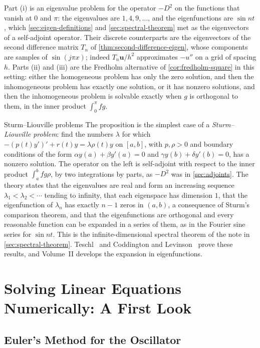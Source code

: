 Part (i) is an eigenvalue problem for the operator $-D^2$ on the functions that vanish at $0$ and $\pi$: the eigenvalues are $1,4,9,\ldots$, and the eigenfunctions are $\sin nt$, which \cref{sec:eigen-definitions} and \cref{sec:spectral-theorem} met as the eigenvectors of a self-adjoint operator. Their discrete counterparts are the eigenvectors of the second difference matrix $T_n$ of \cref{thm:second-difference-eigen}, whose components are samples of $\sin(j\pi x)$; indeed $T_n\mathbf u/h^2$ approximates $-u''$ on a grid of spacing $h$. Parts (ii) and (iii) are the Fredholm alternative of \cref{cor:fredholm-square} in this setting: either the homogeneous problem has only the zero solution, and then the inhomogeneous problem has exactly one solution, or it has nonzero solutions, and then the inhomogeneous problem is solvable exactly when $g$ is orthogonal to them, in the inner product $\int_0^\pi fg$.

\begin{note}{Sturm--Liouville problems}
The proposition is the simplest case of a \emph{Sturm--Liouville problem}: find the numbers $\lambda$ for which $-(p(t)y')'+r(t)y=\lambda\rho(t)y$ on $[a,b]$, with $p,\rho>0$ and boundary conditions of the form $\alpha y(a)+\beta y'(a)=0$ and $\gamma y(b)+\delta y'(b)=0$, has a nonzero solution. The operator on the left is self-adjoint with respect to the inner product $\int_a^bfg\rho$, by two integrations by parts, as $-D^2$ was in \cref{sec:adjoints}. The theory states that the eigenvalues are real and form an increasing sequence $\lambda_1<\lambda_2<\cdots$ tending to infinity, that each eigenspace has dimension $1$, that the eigenfunction of $\lambda_n$ has exactly $n-1$ zeros in $(a,b)$, a consequence of Sturm's comparison theorem, and that the eigenfunctions are orthogonal and every reasonable function can be expanded in a series of them, as in the Fourier sine series for $\sin nt$. This is the infinite-dimensional spectral theorem of the note in \cref{sec:spectral-theorem}. Teschl~\cite[Chap.~5]{teschl2012} and Coddington and Levinson~\cite[Chaps.~7 and~8]{coddington1955} prove these results, and Volume~II develops the expansion in eigenfunctions.
\end{note}

\section{Solving Linear Equations Numerically: A First Look}
\label{sec:higher-numerics}

\subsection{Euler's Method for the Oscillator}


